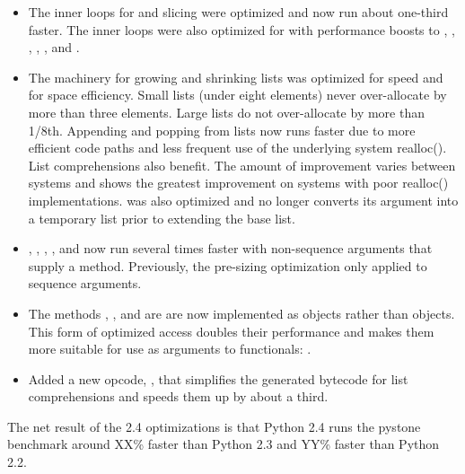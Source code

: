 \documentclass{howto}
\begin{document}
\begin{itemize}

\item The inner loops for  and  slicing
 were optimized and now run about one-third faster.  The inner
 loops were also optimized for  with performance
 boosts to , , ,
, , and .

\item The machinery for growing and shrinking lists was optimized
 for speed and for space efficiency.  Small lists (under eight elements)
 never over-allocate by more than three elements.  Large lists do not
 over-allocate by more than 1/8th.  Appending and popping from lists
 now runs faster due to more efficient code paths and less frequent
 use of the underlying system realloc().  List comprehensions also
 benefit.  The amount of improvement varies between systems and shows
 the greatest improvement on systems with poor realloc() implementations.
  was also optimized and no longer converts its
 argument into a temporary list prior to extending the base list.

\item {}, , ,
  , and  now run several times
  faster with non-sequence arguments that supply a 
  method.  Previously, the pre-sizing optimization only applied to
  sequence arguments.

\item The methods ,
  , and  are
  are now implemented as  objects rather
  than  objects.  This form of optimized
  access doubles their performance and makes them more suitable for
  use as arguments to functionals:
  .

\item Added a new opcode, , that simplifies
  the generated bytecode for list comprehensions and speeds them up
  by about a third.

\end{itemize}

The net result of the 2.4 optimizations is that Python 2.4 runs the
pystone benchmark around XX\% faster than Python 2.3 and YY\% faster
than Python 2.2.
\end{document}
